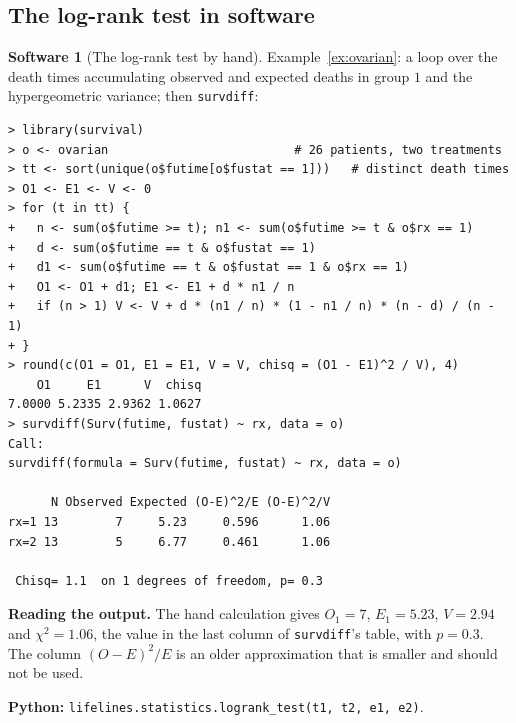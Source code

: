 \documentclass[11pt,a4paper]{article}
\numberwithin{equation}{section}
\theoremstyle{definition}
\newtheorem{software}[thm]{Software}
\begin{document}
\subsection{The log-rank test in software}
\label{ssec:software6}

\begin{software}[The log-rank test by hand]
\label{sw:logrankhand}
Example~\ref{ex:ovarian}: a loop over the death times accumulating observed and expected deaths in group $1$ and the hypergeometric variance; then \texttt{survdiff}:
{\small\begin{verbatim}
> library(survival)
> o <- ovarian                          # 26 patients, two treatments
> tt <- sort(unique(o$futime[o$fustat == 1]))   # distinct death times
> O1 <- E1 <- V <- 0
> for (t in tt) {
+   n <- sum(o$futime >= t); n1 <- sum(o$futime >= t & o$rx == 1)
+   d <- sum(o$futime == t & o$fustat == 1)
+   d1 <- sum(o$futime == t & o$fustat == 1 & o$rx == 1)
+   O1 <- O1 + d1; E1 <- E1 + d * n1 / n
+   if (n > 1) V <- V + d * (n1 / n) * (1 - n1 / n) * (n - d) / (n - 1)
+ }
> round(c(O1 = O1, E1 = E1, V = V, chisq = (O1 - E1)^2 / V), 4)
    O1     E1      V  chisq 
7.0000 5.2335 2.9362 1.0627 
> survdiff(Surv(futime, fustat) ~ rx, data = o)
Call:
survdiff(formula = Surv(futime, fustat) ~ rx, data = o)

      N Observed Expected (O-E)^2/E (O-E)^2/V
rx=1 13        7     5.23     0.596      1.06
rx=2 13        5     6.77     0.461      1.06

 Chisq= 1.1  on 1 degrees of freedom, p= 0.3 
\end{verbatim}}
\textbf{Reading the output.} The hand calculation gives $O_1 = 7$, $E_1 = 5.23$, $V = 2.94$ and $\chi^2 = 1.06$, the value in the last column of \texttt{survdiff}'s table, with $p = 0.3$. The column $(O - E)^2/E$ is an older approximation that is smaller and should not be used.

\textbf{Python:} \texttt{lifelines.statistics.logrank\_test(t1, t2, e1, e2)}.
\end{software}
\end{document}
